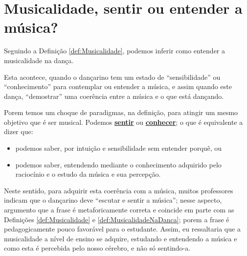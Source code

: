 
\section{Musicalidade, sentir ou entender a música?}
Seguindo a Definição \ref{def:Musicalidade}, podemos inferir como entender a musicalidade na dança.
\begin{definition} 
\label{def:MusicalidadeNaDanca}
Esta acontece, quando o dançarino tem um estado de ``sensibilidade'' ou ``conhecimento'' para contemplar ou entender a música,
e assim quando este dança, ``demostrar'' uma coerência entre a música e o que está dançando.
\end{definition}

Porem temos um choque de paradigmas, na definição, para atingir um mesmo objetivo que é ser musical.
Podemos \hyperref[ref:emotionsentimental]{\textbf{sentir}} ou 
\hyperref[subsec:tecnica-sentimentos]{\textbf{conhecer}}; o que é equivalente a dizer que:
\begin{itemize} 
\item podemos saber, por intuição e sensibilidade sem entender porquê, ou
\item podemos saber, entendendo mediante o conhecimento adquirido pelo raciocínio e o estudo da música e sua percepção.
\end{itemize}



Neste sentido, para adquirir esta coerência com a música, 
muitos professores indicam que o dançarino deve ``escutar e sentir a música'';
nesse aspecto, argumento que a frase é metaforicamente correta e coincide em parte com 
as Definições \ref{def:Musicalidade} e \ref{def:MusicalidadeNaDanca};
porem a frase  é pedagogicamente pouco favorável para o estudante.
Assim, eu ressaltaria que a musicalidade a nível de ensino se adquire,
estudando e entendendo a música e como esta é percebida pelo nosso cérebro, e não só sentindo-a.
 

